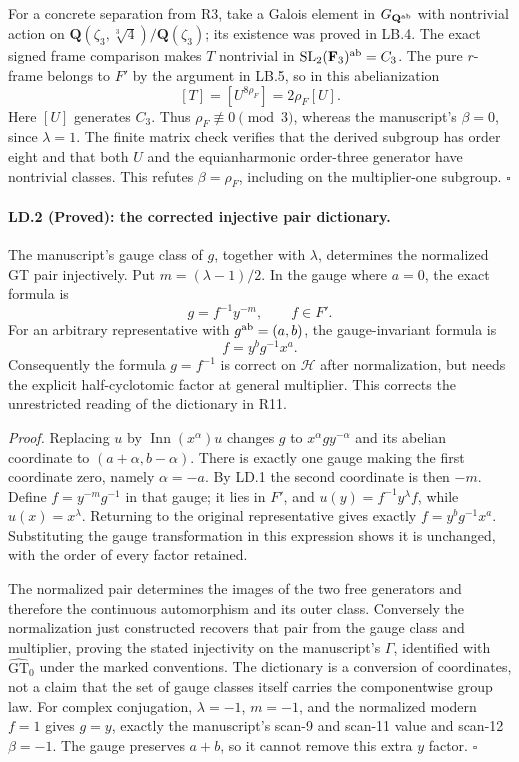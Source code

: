 For a concrete separation from R3, take a Galois element in
$G_{\mathbf Q^{\rm ab}}$ with nontrivial action on
$\mathbf Q(\zeta_3,\sqrt[3]4)/\mathbf Q(\zeta_3)$; its
existence was proved in LB.4. The exact signed frame comparison
makes $T$ nontrivial in
$\mathrm{SL}_2(\mathbf F_3)^{\rm ab}=C_3$. The pure $r$-frame
belongs to $F'$ by the argument in LB.5, so in this abelianization
\[
                   [T]=[U^{8\rho_F}]=2\rho_F[U].
\]
Here $[U]$ generates $C_3$. Thus $\rho_F\not\equiv0\pmod3$,
whereas the manuscript's $\beta=0$, since $\lambda=1$.
The finite matrix check verifies that the derived subgroup
has order eight and that both $U$ and the equianharmonic
order-three generator have nontrivial classes. This refutes
$\beta=\rho_F$, including on the multiplier-one subgroup.
\hfill$\square$

\paragraph{LD.2 (Proved): the corrected injective pair dictionary.}
The manuscript's gauge class of $g$, together with $\lambda$,
determines the normalized GT pair injectively. Put
$m=(\lambda-1)/2$. In the gauge where $a=0$, the exact formula is
\[
                   g=f^{-1}y^{-m},\qquad f\in F'.
\]
For an arbitrary representative with $g^{\rm ab}=(a,b)$, the
gauge-invariant formula is
\[
                          f=y^b g^{-1}x^a.
\]
Consequently the formula $g=f^{-1}$ is correct on
$\mathcal H$ after normalization, but needs the explicit
half-cyclotomic factor at general multiplier. This corrects
the unrestricted reading of the dictionary in R11.

\emph{Proof.}
Replacing $u$ by $\operatorname{Inn}(x^\alpha)u$ changes $g$
to $x^\alpha gy^{-\alpha}$ and its abelian coordinate to
$(a+\alpha,b-\alpha)$. There is exactly one gauge making
the first coordinate zero, namely $\alpha=-a$. By LD.1 the
second coordinate is then $-m$. Define $f=y^{-m}g^{-1}$
in that gauge; it lies in $F'$, and
$u(y)=f^{-1}y^\lambda f$, while $u(x)=x^\lambda$.
Returning to the original representative gives exactly
$f=y^b g^{-1}x^a$. Substituting the gauge transformation
in this expression shows it is unchanged, with the order
of every factor retained.

The normalized pair determines the images of the two free
generators and therefore the continuous automorphism and its
outer class. Conversely the normalization just constructed
recovers that pair from the gauge class and multiplier, proving
the stated injectivity on the manuscript's $\Gamma$, identified
with $\widehat{\mathrm{GT}}_0$ under the marked conventions.
The dictionary is a conversion of coordinates, not a claim
that the set of gauge classes itself carries the componentwise
group law. For complex conjugation, $\lambda=-1$, $m=-1$,
and the normalized modern $f=1$ gives $g=y$, exactly the
manuscript's scan-9 and scan-11 value and scan-12 $\beta=-1$.
The gauge preserves $a+b$, so it cannot remove this extra
$y$ factor. \hfill$\square$
